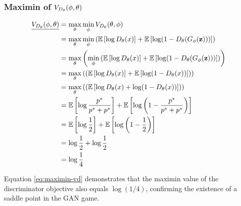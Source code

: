 \subsubsection{Maximin of $V_{D_\theta}(\phi, \theta)$}
\label{sec:maximin-vd}
\begin{align}
	\underline{V_{D_\theta}(\phi, \theta)} & =
	\max_{\mathbf{\theta}}\min_{\mathbf{\phi}}V_{D_\theta}(\theta,
	\phi) \nonumber                                                                                                                  \\
	                & =
	\max_{\mathbf{\theta}}\min_{\mathbf{\phi}} \left(
	\mathbb{E}\left[\log{D_\theta(x)}\right] +
	\mathbb{E}\left[\log(1 - D_\theta(G_\phi(\mathbf{z})))\right]\right) \nonumber                                                             \\
	                & = \max_{\mathbf{\theta}}\left(\min_{\mathbf{\phi}} \left(
		\mathbb{E}\left[\log{D_\theta(x)}\right] +
		\mathbb{E}\left[\log(1 -
	D_\theta(G_\phi(\mathbf{z})))\right]\right)\right) \nonumber                                                                               \\
	                & = \max_{\mathbf{\theta}}\left(\left(
		\mathbb{E}\left[\log{D_\theta(x)}\right] +
		\mathbb{E}\left[\log(1 -
	D_\theta(x))\right]\right)\right) \nonumber                                                                                            \\
	                & = \max_{\mathbf{\theta}}\left(\left(
		\mathbb{E}\left[\log{D_\theta(x)} +
	\log(1 - D_\theta(x))\right]\right)\right) \nonumber                                                                                   \\
	                & = \mathbb{E}\left[\log{p^*\over p^*+ p^*}\right]
	+ \mathbb{E}\left[\log\left(1 - {p^* \over p^* + p^*}\right)\right] \nonumber                                                    \\
	                & = \mathbb{E}\left[\log{1 \over 2}\right] + \mathbb{E}\left[\log{\left(1 - {1 \over 2}\right)}\right] \nonumber \\
	                & = \log{1 \over 2} + \log{1 \over 2} \nonumber                                                                  \\
	                & = \log{1 \over 4} \label{eq:maximin-vd}
\end{align}

Equation \ref{eq:maximin-vd} demonstrates that the maximin value of the discriminator objective also equals $\log(1/4)$, confirming the existence of a saddle point in the GAN game.

